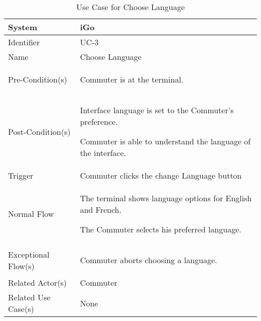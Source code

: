 \begin{table}[ht]
    \centering
    \begin{tabular}{|l|p{11cm}|}
         \hline
         System             & iGo\\
         \hline
         Identifier         & UC-3 \\
         \hline
         Name               & Choose Language \\
         \hline
         Pre-Condition(s)   & 
         \begin{enumerate*}[itemjoin=\newline]
             \item Commuter is at the terminal.
         \end{enumerate*} \\
         \hline
         Post-Condition(s)  & 
         \begin{enumerate*}[itemjoin=\newline]
             \item Interface language is set to the Commuter's preference.
             \item Commuter is able to understand the language of the interface.
         \end{enumerate*} \\
         \hline
         Trigger            & Commuter clicks the change Language button \\
         \hline
         Normal Flow        & 
         \begin{enumerate*}[itemjoin=\newline]
             \item The terminal shows language options for English and French.
             \item The Commuter selects his preferred language.
         \end{enumerate*} \\
         \hline
         Exceptional Flow(s)& 
         \begin{enumerate*}[itemjoin=\newline]
             \item Commuter aborts choosing a language.
         \end{enumerate*} \\
         \hline
         Related Actor(s)   & Commuter \\
         \hline
         Related Use Case(s)& None\\
         \hline
    \end{tabular}
    \caption{Use Case for Choose Language}
    \label{tab:UC_ChooseLanguage}
\end{table}

